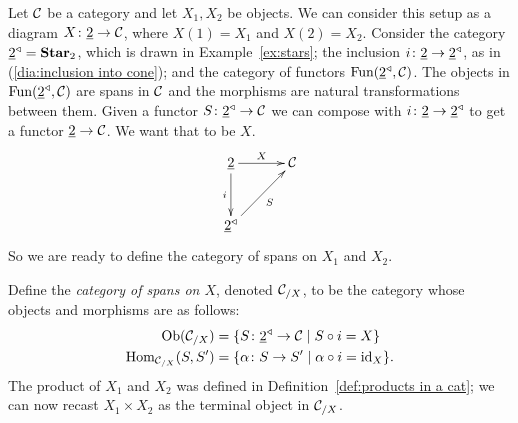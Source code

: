 \documentclass[CT4S-EN-RU]{subfiles}
\begin{document}
\begin{constructionENG}[Products]
Let $\mathcal{C}$ be a category and let $X_1,X_2$ be objects. We can consider this setup as a diagram $X\colon\underline{2}\rightarrow\mathcal{C}$, where $X(1)=X_1$ and $X(2)=X_2$. Consider the category $\underline{2}^\triangleleft={\mathbf{Star}}_2$, which is drawn in Example~\ref{ex:stars}; the inclusion $i\colon\underline{2}\rightarrow\underline{2}^\triangleleft$, as in (\ref{dia:inclusion into cone}); and the category of functors $\textnormal{Fun}(\underline{2}^\triangleleft,\mathcal{C})$. The objects in $\textnormal{Fun}(\underline{2}^\triangleleft,\mathcal{C})$ are spans in $\mathcal{C}$ and the morphisms are natural transformations between them. Given a functor $S\colon\underline{2}^\triangleleft\rightarrow\mathcal{C}$ we can compose with $i\colon\underline{2}\rightarrow\underline{2}^\triangleleft$ to get a functor $\underline{2}\rightarrow\mathcal{C}$. We want that to be $X$.
$$\xymatrix@=30pt{\ul{2}\ar[r]^{X}\ar[d]_i&\mcC\\\ul{2}\lcone\ar[ur]_S}$$
So we are ready to define the category of spans on $X_1$ and $X_2$.

Define the {\em category of spans on $X$}, denoted $\mathcal{C}_{/X}$, to be the category whose objects and morphisms are as follows:
\begin{align}\label{dia:slice for products}
\textnormal{Ob}(\mathcal{C}_{/X})&=\{S\colon\underline{2}^\triangleleft\rightarrow\mathcal{C}{\;|\;}S\circ i=X\}\\
\nonumber\textnormal{Hom}_{\mathcal{C}_{/X}}(S,S')&=\{\alpha\colon S\rightarrow S'{\;|\;}\alpha\circ i=\textnormal{id}_X\}.
\end{align}
The product of $X_1$ and $X_2$ was defined in Definition~\ref{def:products in a cat}; we can now recast $X_1\times X_2$ as the terminal object in $\mathcal{C}_{/X}$.


\end{constructionENG}
\end{document}
